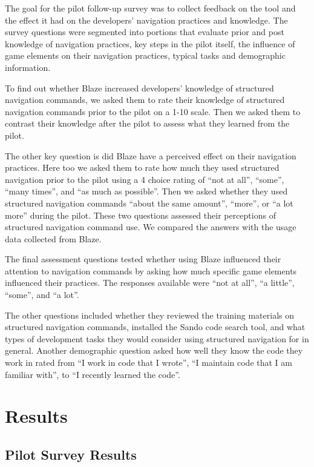 \documentclass{sig-alternate}
\begin{document}
The goal for the pilot follow-up survey was to collect feedback on the tool and the effect it had on the developers' navigation practices and knowledge.  The survey questions were segmented into portions that evaluate prior and post knowledge of navigation practices, key steps in the pilot itself, the influence of game elements on their navigation practices, typical tasks and demographic information.

To find out whether Blaze increased developers'  knowledge of structured navigation commands, we asked them to rate their knowledge of structured navigation commands prior to the pilot on a 1-10 scale.  Then we asked them to contrast their knowledge after the pilot to assess what they learned from the pilot.

The other key question is did Blaze have a perceived effect on their navigation practices.  Here too we asked them to rate how much they used structured navigation prior to the pilot using a 4 choice rating of ``not at all'', ``some'', ``many times'', and ``as much as possible''.  Then we asked whether they used structured navigation commands ``about the same amount'', ``more'',  or ``a lot more'' during the pilot.  These two questions assessed their perceptions of structured navigation command use.  We compared the answers with the usage data collected from Blaze.

The final assessment questions tested whether using Blaze influenced their attention to navigation commands by asking how much specific game elements influenced their practices.  The responses available were ``not at all'', ``a little'', ``some'', and ``a lot''.  

The other questions included whether they reviewed the training materials on structured navigation commands, installed the Sando code search tool, and what types of development tasks they would consider using structured navigation for in general.  Another demographic question asked how well they know the code they work in rated from ``I work in code that I wrote'', ``I maintain code that I am familiar with'', to ``I recently learned the code''.

\section{Results}

\subsection{Pilot Survey Results}
\end{document}
